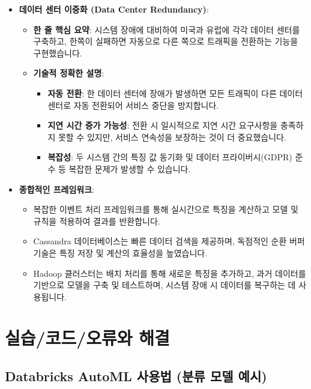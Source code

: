 \documentclass[11pt,a4paper]{article}
\theoremstyle{definition}
\begin{document}
\begin{itemize}
\begin{itemize}
\begin{itemize}
\begin{itemize}
\begin{itemize}
\begin{itemize}
    \item \textbf{데이터 센터 이중화 (Data Center Redundancy)}:
    \begin{itemize}
        \item \textbf{한 줄 핵심 요약}: 시스템 장애에 대비하여 미국과 유럽에 각각 데이터 센터를 구축하고, 한쪽이 실패하면 자동으로 다른 쪽으로 트래픽을 전환하는 기능을 구현했습니다.
        \item \textbf{기술적 정확한 설명}:
        \begin{itemize}
            \item \textbf{자동 전환}: 한 데이터 센터에 장애가 발생하면 모든 트래픽이 다른 데이터 센터로 자동 전환되어 서비스 중단을 방지합니다.
            \item \textbf{지연 시간 증가 가능성}: 전환 시 일시적으로 지연 시간 요구사항을 충족하지 못할 수 있지만, 서비스 연속성을 보장하는 것이 더 중요했습니다.
            \item \textbf{복잡성}: 두 시스템 간의 특징 값 동기화 및 데이터 프라이버시(GDPR) 준수 등 복잡한 문제가 발생할 수 있습니다.
        \end{itemize}
    \end{itemize}
    \item \textbf{종합적인 프레임워크}:
    \begin{itemize}
        \item 복잡한 이벤트 처리 프레임워크를 통해 실시간으로 특징을 계산하고 모델 및 규칙을 적용하여 결과를 반환합니다.
        \item Cassandra 데이터베이스는 빠른 데이터 검색을 제공하며, 독점적인 순환 버퍼 기술은 특징 저장 및 계산의 효율성을 높였습니다.
        \item Hadoop 클러스터는 배치 처리를 통해 새로운 특징을 추가하고, 과거 데이터를 기반으로 모델을 구축 및 테스트하며, 시스템 장애 시 데이터를 복구하는 데 사용됩니다.
    \end{itemize}
\end{itemize}

\newpage
\section*{실습/코드/오류와 해결}

\subsection*{Databricks AutoML 사용법 (분류 모델 예시)}


\end{itemize}
\end{itemize}
\end{itemize}
\end{itemize}
\end{itemize}
\end{document}
